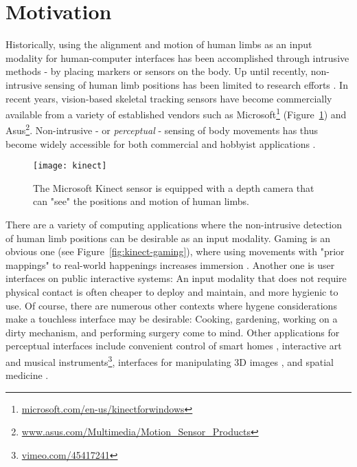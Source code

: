 \section{Motivation} %

Historically, using the alignment and motion of human limbs as an input modality for human-computer interfaces has been accomplished through intrusive methods - by placing markers or sensors on the body. Up until recently, non-intrusive sensing of human limb positions has been limited to research efforts \parencite{Moeslund:2006, Moeslund:2001, Gavrila:1999}. In recent years, vision-based skeletal tracking sensors have become commercially available from a variety of established vendors such as Microsoft\footnote{\href{http://www.microsoft.com/en-us/kinectforwindows/}{microsoft.com/en-us/kinectforwindows}} (Figure~\ref{fig:kinect}) and Asus\footnote{\href{http://www.asus.com/Multimedia/Motion_Sensor_Products/}{www.asus.com/Multimedia/Motion\_Sensor\_Products}}. Non-intrusive - or \emph{perceptual} \parencite{Turk:2000, Crowley:2000} - sensing of body movements has thus become widely accessible for both commercial and hobbyist applications \parencite{Francese:2012}.

\begin{figure}[ht]
\centering
\texttt{[image: kinect]}
\caption{The Microsoft Kinect sensor is equipped with a depth camera that can "see" the positions and motion of human limbs.}
\label{fig:kinect}
\end{figure}

There are a variety of computing applications where the non-intrusive detection of human limb positions can be desirable as an input modality. Gaming is an obvious one (see Figure~\ref{fig:kinect-gaming}), where using movements with "prior mappings" to real-world happenings increases immersion \parencite{Cairns:2014}. Another one is user interfaces on public interactive systems: An input modality that does not require physical contact is often cheaper to deploy and maintain, and more hygienic to use. Of course, there are numerous other contexts where hygene considerations make a touchless interface may be desirable: Cooking, gardening, working on a dirty mechanism, and performing surgery \parencite{Wen:2013} come to mind. Other applications for perceptual interfaces include convenient control of smart homes \parencite{Tang:2013}, interactive art and musical instruments\footnote{\href{http://vimeo.com/45417241}{vimeo.com/45417241}}, interfaces for manipulating 3D images \parencite{Gallo:2013}, and spatial medicine \parencite{Lozano-Quilis:2013, Huang:2011, Simmons:2013}.

